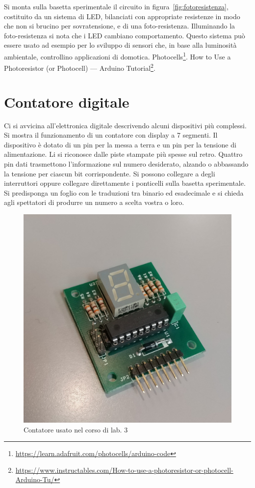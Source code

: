 \documentclass[a4paper]{article}
\begin{document}
Si monta sulla basetta sperimentale il circuito in
figura~\ref{fig:fotoresistenza}, costituito da un sistema di LED, bilanciati con
appropriate resistenze in modo che non si brucino per sovratensione, e di una
foto-resistenza. Illuminando la foto-resistenza si nota che i LED cambiano
comportamento. Questo sistema può essere usato ad esempio per lo sviluppo di
sensori che, in base alla luminosità ambientale, controllino applicazioni di
domotica. Photocells\footnote{
  \url{https://learn.adafruit.com/photocells/arduino-code}}. How to Use a
Photoresistor (or Photocell) --- Arduino Tutorial\footnote{
  \url{https://www.instructables.com/How-to-use-a-photoresistor-or-photocell-Arduino-Tu/}}.

\section{Contatore digitale}%
\label{sec:contatore}

Ci si avvicina all'elettronica digitale descrivendo alcuni dispositivi più
complessi. Si mostra il funzionamento di un contatore con display a 7 segmenti.
Il dispositivo è dotato di un pin per la messa a terra e un pin per la tensione
di alimentazione. Li si riconosce dalle piste stampate più spesse sul retro.
Quattro pin dati trasmettono l'informazione sul numero desiderato, alzando o
abbassando la tensione per ciascun bit corrispondente. Si possono collegare a
degli interruttori oppure collegare direttamente i ponticelli sulla basetta
sperimentale. Si predisponga un foglio con le traduzioni tra binario ed
esadecimale e si chieda agli spettatori di produrre un numero a scelta vostra o
loro.

\begin{figure}[ht]
  \centering
  \includegraphics[width=\linewidth]{figures/contatore}
  \caption{\label{fig:contatore} Contatore usato nel corso di lab. 3}
\end{figure}
\end{document}
